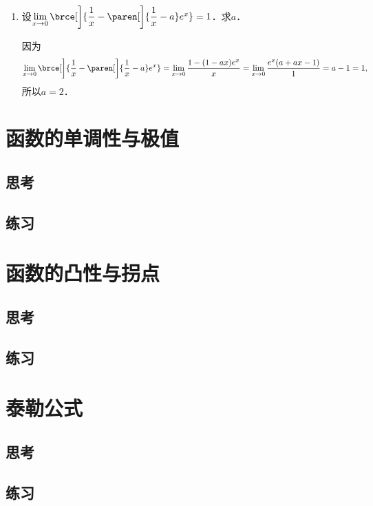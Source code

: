 \begin{enumerate}
\item 设\(\lim\limits_{x\to0} {}\brce[\bigg]{\dfrac1x - \paren[\bigg]{\dfrac1x - a} e^x} = 1\)．求\(a\)．

  \ifshowsol
    因为
    \begin{equation*}
      \lim_{x\to0} {}\brce[\bigg]{\frac1x - \paren[\bigg]{\frac1x - a} e^x}
      = \lim_{x\to0} \frac{1-(1-ax)e^x}{x}
      =  \lim_{x\to0} \frac{e^x(a+ax-1)}{1}
      = a-1 = 1,
    \end{equation*}
    所以\(a = 2\)．
  \fi
\end{enumerate}
\fi

\section{函数的单调性与极值}

\subsection*{思考}

\ifshowex
{}
\subsection*{练习}
\fi

\section{函数的凸性与拐点}

\subsection*{思考}

\ifshowex
{}
\subsection*{练习}
\fi

\section{泰勒公式}

\subsection*{思考}

\ifshowex
{}
\subsection*{练习}
\fi

